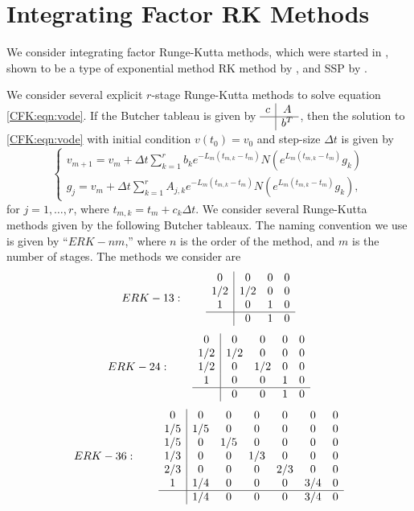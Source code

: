 \documentclass{csri19}
\begin{document}
\section{Integrating Factor RK Methods}\label{CFK:sec:ifrk}
We consider integrating factor Runge-Kutta methods, which were started in 
\cite{CFK:Lawson1969}, shown to be a type of exponential method RK method by
\cite{CFK:Minchev2006}, and SSP by \cite{CFK:Isherwood2018}.

We consider several explicit $r$-stage Runge-Kutta methods to solve equation
\ref{CFK:eqn:vode}. If the Butcher tableau is given by $\begin{array}{c|c}
c & A \\ \hline & b^T \end{array}$, then the solution to \ref{CFK:eqn:vode} with
initial condition $v(t_0) = v_0$ and step-size $\Delta t$ is given by
\[ \left\{\begin{array}{l} v_{m+1} = v_m + \Delta t\sum_{k=1}^r b_k 
                         e^{-L_m(t_{m,k}-t_m)}N(e^{L_m(t_{m,k}-t_m)}g_k) \\
          g_j = v_m + \Delta t \sum_{k=1}^r A_{j,k} e^{-L_m(t_{m,k} - t_m)} 
                      N(e^{L_m(t_{m,k}-t_m)}g_k), \end{array} \right. \]
for $j = 1,\dots,r$, where $t_{m,k} = t_m + c_k \Delta t$.
We consider several Runge-Kutta methods given by the
following Butcher tableaux. The naming convention we use is given by ``$ERK
-nm$,'' where $n$ is the order of the method, and $m$ is the number of
stages. The methods we consider are
\[ ERK-13: \qquad
 \begin{array}{c|ccc}
0   & 0   & 0 & 0\\
1/2 & 1/2 & 0 & 0\\
1   & 0   & 1 & 0\\
\hline
    & 0   & 1 & 0
\end{array}\]
\[ ERK-24: \qquad
\begin{array}{c|cccc}
0   & 0   & 0   & 0 & 0\\
1/2 & 1/2 & 0   & 0 & 0\\
1/2 & 0   & 1/2 & 0 & 0\\
1   & 0   & 0   & 1 & 0\\
\hline
    & 0   & 0   & 1 & 0
\end{array}\]
\[ ERK-36: \qquad
\begin{array}{c|cccccc}
0   & 0   & 0   & 0   & 0   & 0   & 0\\
1/5 & 1/5 & 0   & 0   & 0   & 0   & 0\\
1/5 & 0   & 1/5 & 0   & 0   & 0   & 0\\
1/3 & 0   & 0   & 1/3 & 0   & 0   & 0\\
2/3 & 0   & 0   & 0   & 2/3 & 0   & 0\\
1   & 1/4 & 0   & 0   & 0   & 3/4 & 0\\
\hline
    & 1/4 & 0   & 0   & 0   & 3/4 & 0
\end{array}\]
\end{document}

